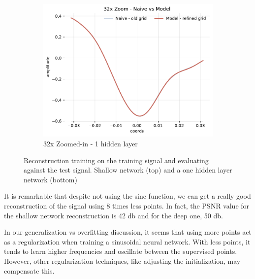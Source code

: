 \begin{figure}[!h]
\begin{subfigure}[b]{0.32\textwidth}
        \centering
        \includegraphics[width=\textwidth]{img/ch3/32x-64hf-1hl-16w-sub3.pdf}
        \caption{32x Zoomed-in - 1 hidden layer}
    \end{subfigure}
    \caption{Reconstruction training on the training signal and evaluating against the test signal. Shallow network (top) and a one hidden layer network (bottom)}
    \label{f:pred-256samples-shallow-deep-adjusted}
\end{figure}


It is remarkable that despite not using the sinc function, we can get a really good reconstruction of the signal using 8 times less points. In fact, the PSNR value for the shallow network reconstruction is 42 db and for the deep one, 50 db. 

In our generalization vs overfitting discussion, it seems that using more points act as a regularization when training a sinusoidal neural network. With less points, it tends to learn higher frequencies and oscillate between the supervised points. However, other regularization techniques, like adjusting the initialization, may compensate this.

